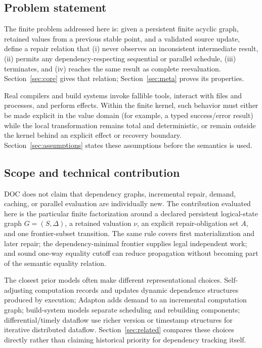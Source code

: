 \subsection{Problem statement}
The finite problem addressed here is: given a persistent finite acyclic graph, retained values from a previous stable point, and a validated source update, define a repair relation that (i) never observes an inconsistent intermediate result, (ii) permits any dependency-respecting sequential or parallel schedule, (iii) terminates, and (iv) reaches the same result as complete reevaluation. Section~\ref{sec:core} gives that relation; Section~\ref{sec:meta} proves its properties.

Real compilers and build systems invoke fallible tools, interact with files and processes, and perform effects. Within the finite kernel, such behavior must either be made explicit in the value domain (for example, a typed success/error result) while the local transformation remains total and deterministic, or remain outside the kernel behind an explicit effect or recovery boundary. Section~\ref{sec:assumptions} states these assumptions before the semantics is used.

\subsection{Scope and technical contribution}
DOC does not claim that dependency graphs, incremental repair, demand, caching, or parallel evaluation are individually new. The contribution evaluated here is the particular finite factorization around a declared persistent logical-state graph $G=(S,\Delta)$, a retained valuation $\nu$, an explicit repair-obligation set $A$, and one frontier-subset transition. The same rule covers first materialization and later repair; the dependency-minimal frontier supplies legal independent work; and sound one-way equality cutoff can reduce propagation without becoming part of the semantic equality relation.

The closest prior models often make different representational choices. Self-adjusting computation records and updates dynamic dependence structures produced by execution; Adapton adds demand to an incremental computation graph; build-system models separate scheduling and rebuilding components; differential/timely dataflow use richer version or timestamp structures for iterative distributed dataflow. Section~\ref{sec:related} compares these choices directly rather than claiming historical priority for dependency tracking itself.

